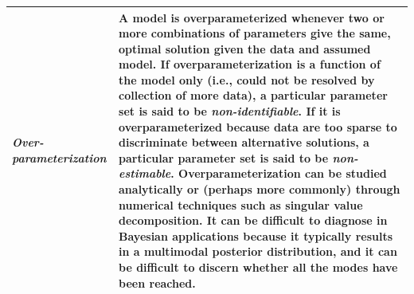 \documentclass[12pt,english]{article}
\begin{document}
\begin{spacing}{1.9}
\begin{table}[ht]
\begin{tabular}{p{3cm}p{13cm}}
        \textit{Over-parameterization} & A model is overparameterized whenever two or more combinations of parameters give the same, optimal solution given the data and assumed model.  If overparameterization is a function of the model only (i.e., could not be resolved by collection of more data), a particular parameter set is said to be \textit{non-identifiable}.  If it is overparameterized because data are too sparse to discriminate between alternative solutions, a particular parameter set is said to be \textit{non-estimable}.  Overparameterization can be studied analytically or (perhaps more commonly) through numerical techniques such as singular value decomposition.  It can be difficult to diagnose in Bayesian applications because it typically results in a multimodal posterior distribution, and it can be difficult to discern whether all the modes have been reached. \\
        \hline
      \end{tabular}
    \end{table}


\end{spacing}
\end{document}
